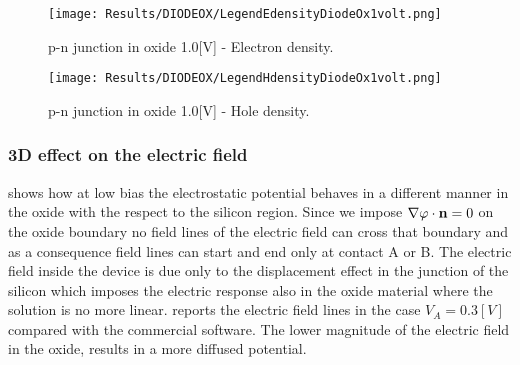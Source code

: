 \vspace{0.5cm}

\begin{figure}[!h]
\centering
{}
\hspace{0.1\textwidth}
\hspace{0.04\textwidth}
{\texttt{[image: Results/DIODEOX/LegendEdensityDiodeOx1volt.png]}}
\caption{p-n junction in oxide 1.0[V] - Electron density.}
\label{fig: edensity diodeox 1V}
\end{figure}

\vspace{0.5cm}

\begin{figure}[!h]
\centering
{}
\hspace{0.1\textwidth}
\hspace{0.04\textwidth}
{\texttt{[image: Results/DIODEOX/LegendHdensityDiodeOx1volt.png]}}
\caption{p-n junction in oxide 1.0[V] - Hole density.}
\label{fig: hdensity diodeox 1V}
\end{figure}

\clearpage





\subsubsection{3D effect on the electric field}


 shows how at low bias the electrostatic potential behaves in a different manner in the oxide with the respect to the silicon region.
Since we impose $\nabla \varphi \cdot \mathbf{n}=0$ on the oxide boundary no field lines of the electric field can cross that boundary and as a consequence field lines can start and end only at contact A or B.
The electric field inside the device is due only to the displacement effect in the junction of the silicon which imposes the electric response also in the oxide material where the solution is no more linear.  reports the electric field lines in the case $V_A=0.3[V]$ compared with the commercial software. The lower magnitude of the electric field in the oxide, results in a more diffused potential.

